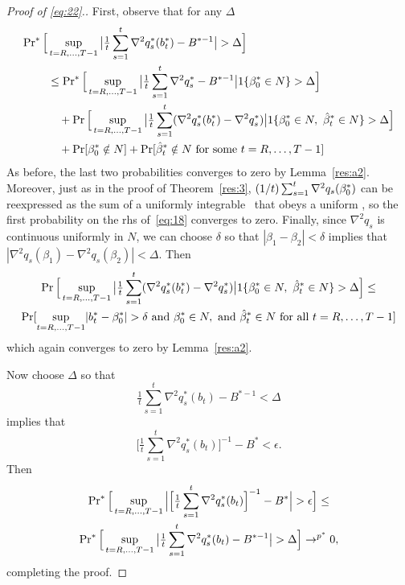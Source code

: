 \documentclass[12pt,fleqn]{article}
\begin{document}
\begin{proof}[Proof of \eqref{eq:22}.]
First, observe that for any $\Delta$
\begin{align}\label{eq:18}
  \operatorname{Pr}^*\Big[&\sup_{t = R,\dots,T-1} \big\lvert \tfrac{1}{t} \sum_{s=1}^t \nabla^2 q_s^*(b_t^*) - B^{*-1} \big\rvert > \Delta \Big] \\
  &\leq \operatorname{Pr}^*\Big[\sup_{t=R,\dots,T-1} \big\lvert \tfrac{1}{t} \sum_{s=1}^t \nabla^2 q_s^* - B^{*-1} \big\rvert 1\{\beta_0^* \in N\}> \Delta \Big]\\
  &\quad + \operatorname{Pr}\Big[\sup_{t=R,\dots,T-1} \big\lvert \tfrac{1}{t} \sum_{s=1}^t (\nabla^2 q_s^*(b_t^*) - \nabla^2 q_s^*) \big\rvert 1\{\beta_0^* \in N,\ \hat \beta_t^* \in N\} > \Delta \Big] \\
  &\quad + \operatorname{Pr}[\beta_0^* \notin N] + \operatorname{Pr}[\hat \beta_t^* \notin N \text{ for some } t = R,\dots,T-1]
\end{align}
As before, the last two probabilities converges to zero by
Lemma~\ref{res:a2}.  Moreover, just as in the proof of
Theorem~\ref{res:3}, $(1/t) \sum_{s=1}^t \nabla^2 q_s(\beta_0^*)$ can
be reexpressed as the sum of a uniformly integrable \mds\ that obeys
a uniform \lln, so the first probability on the rhs of~\eqref{eq:18}
converges to zero. Finally, since $\nabla^2 q_s$ is continuous
uniformly in $N$, we can choose $\delta$ so that $|\beta_1 - \beta_2|
< \delta$ implies that $|\nabla^2 q_s(\beta_1) - \nabla^2
q_s(\beta_2)| < \Delta$. Then
\begin{multline*}
  \pr\Big[\sup_{t=R,\dots,T-1} \big\lvert \tfrac{1}{t} \sum_{s=1}^t (\nabla^2 q_s^*(b_t^*) - \nabla^2 q_s^*) \big\rvert 1\{\beta_0^* \in N,\ \bh_t^* \in N\} > \Delta \Big]
  \leq \\
\pr[\sup_{t=R,\dots,T-1}  \lvert b_t^* - \btrue^* \rvert > \delta\text{ and } \btrue^* \in N,\text{ and } \bh_t^* \in N \text{ for all } t = R,\dots,T-1]
\end{multline*}
which again converges to zero by Lemma~\ref{res:a2}.

Now choose $\Delta$ so that
\begin{equation*}
  \tfrac{1}{t} \sum_{s=1}^t \nabla^2 q_s^*(b_t) - B^{*-1} < \Delta
\end{equation*}
implies that
\begin{equation*}
\Big[\tfrac{1}{t} \sum_{s=1}^t \nabla^2 q_s^*(b_t)\Big]^{-1} - B^* < \epsilon.
\end{equation*}
Then
\begin{multline*}
  \operatorname{Pr}^*\Big[\sup_{t=R,\dots,T-1} \Big\lvert\Big[\tfrac{1}{t} \sum_{s=1}^t \nabla^2 q_s^*(b_t)\Big]^{-1} - B^*\Big\rvert
  > \epsilon\Big] \leq \\
  \operatorname{Pr}^*\Big[\sup_{t=R,\dots,T-1}\big\lvert\tfrac{1}{t} \sum_{s=1}^t \nabla^2 q_s^*(b_t) - B^{*-1}\big\rvert > \Delta\Big]
  \to^{p^*} 0,
\end{multline*}
completing the proof.
\end{proof}
\end{document}
